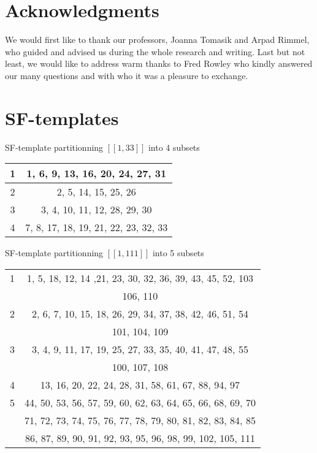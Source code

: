 \documentclass{article}
\newtheorem{computational theorem}{Computational Theorem}[section]
\begin{document}
\section{Acknowledgments}

\par
We would first like to thank our professors, Joanna Tomasik and Arpad Rimmel, who guided and advised 
us during the whole research and writing. Last but not least, we would like to address warm thanks 
to Fred Rowley who kindly answered our many questions and with who it was a pleasure to exchange.





\appendix
\renewcommand{\arraystretch}{1}


\section{SF-templates}

\begin{center}
SF-template partitionning \([\![1, 33]\!]\) into 4 subsets \\
\begin{tabular}{|*{2}{c|}}
	\hline
	1 & 1, 6, 9, 13, 16, 20, 24, 27, 31 \\
	\hline
	2 & 2, 5, 14, 15, 25, 26 \\
	\hline
	3 & 3, 4, 10, 11, 12, 28, 29, 30 \\
	\hline
	4 & 7, 8, 17, 18, 19, 21, 22, 23, 32, 33 \\
	\hline
\end{tabular}
\end{center}

\begin{center}
SF-template partitionning \([\![1, 111]\!]\) into 5 subsets
\begin{tabular}{|*{2}{c|}}
	\hline
	1 & 1, 5, 18, 12, 14 ,21, 23, 30, 32, 36, 39, 43, 45, 52, 103 \\
	 & 106, 110 \\
	\hline
	2 & 2, 6, 7, 10, 15, 18, 26, 29, 34, 37, 38, 42, 46, 51, 54 \\
	& 101, 104, 109 \\
	\hline
	3 & 3, 4, 9, 11, 17, 19, 25, 27, 33, 35, 40, 41, 47, 48, 55 \\
	& 100, 107, 108 \\
	\hline
	4 & 13, 16, 20, 22, 24, 28, 31, 58, 61, 67, 88, 94, 97 \\
	\hline
	5 & 44, 50, 53, 56, 57, 59, 60, 62, 63, 64, 65, 66, 68, 69, 70\\
	& 71, 72, 73, 74, 75, 76, 77, 78, 79, 80, 81, 82, 83, 84, 85\\
	& 86, 87, 89, 90, 91, 92, 93, 95, 96, 98, 99, 102, 105, 111 \\
	\hline
\end{tabular}
\end{center}
\end{document}
